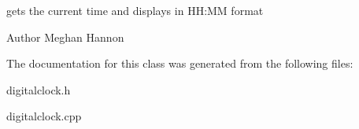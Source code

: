 gets the current time and displays in HH\+:MM format 

\begin{DoxyAuthor}{Author}
Meghan Hannon 
\end{DoxyAuthor}


The documentation for this class was generated from the following files\+:\begin{DoxyCompactItemize}
\item 
digitalclock.\+h\item 
digitalclock.\+cpp\end{DoxyCompactItemize}
